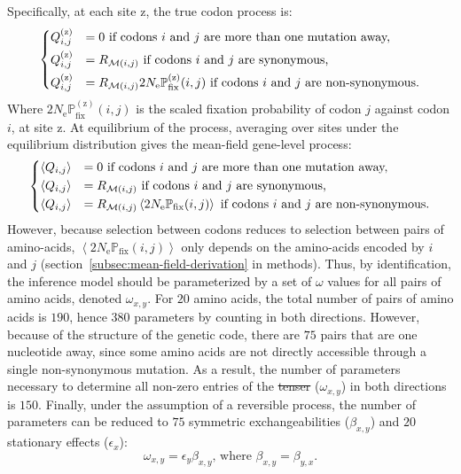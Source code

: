 \documentclass{article}
\newcommand{\Ne}{N_{\text{e}}} %
\newcommand{\proba}{\mathbb{P}} %
\newcommand{\Pfix}{2 \Ne \proba_{\text{fix}}} %
\newcommand{\mutmatrix}{R} %
\newcommand{\ci}{{i}} %
\newcommand{\cj}{{j}} %
\newcommand{\itoj}{\ci, \cj} %
\newcommand{\nuc}{\mathcal{M}} %
\newcommand{\nucitoj}{\nuc(\itoj)} %
\newcommand{\submatrix}{Q} %
\newcommand{\aaSource}{x} %
\newcommand{\aaTarget}{y} %
\newcommand{\AAexchan}{\beta} %
\newcommand{\AAequi}{\epsilon} %
\newcommand{\site}{\text{z}} %
\newcommand{\siteexp}{^{(\site)}} %
\providecommand{\DIFaddtex}[1]{{\protect\color{blue}\uwave{#1}}} %
\providecommand{\DIFdeltex}[1]{{\protect\color{red}\sout{#1}}}                      %
\providecommand{\DIFaddbegin}{} %
\providecommand{\DIFaddend}{} %
\providecommand{\DIFdelbegin}{} %
\providecommand{\DIFdelend}{} %
\providecommand{\DIFadd}[1]{\texorpdfstring{\DIFaddtex{#1}}{#1}} %
\providecommand{\DIFdel}[1]{\texorpdfstring{\DIFdeltex{#1}}{}} %
\begin{document}
Specifically, at each site $\site$, the true codon process is:
\begin{equation}
 \begin{dcases}
 \submatrix_{\itoj}\siteexp & = 0 \text{ if codons $\ci$ and $\cj$ are more than one mutation away,} \\
 \submatrix_{\itoj}\siteexp & = \mutmatrix_{\nucitoj} \text{ if codons $\ci$ and $\cj$ are {synonymous},} \\
 \submatrix_{\itoj}\siteexp & = \mutmatrix_{\nucitoj} \Pfix\siteexp(\itoj) \text{ if codons $\ci$ and $\cj$ are non-synonymous}.
 \end{dcases}
 \label{eq:codon-site-processs}
\end{equation}
Where $\Pfix\siteexp(\itoj)$ is the scaled fixation probability of codon $\cj$ against codon $\ci$, at site $\site$.
At equilibrium of the process, averaging over sites under the equilibrium distribution gives the mean-field gene-level process:
\begin{equation}
 \begin{dcases}
 \left\langle \submatrix_{\itoj} \right\rangle & = 0 \text{ if codons $\ci$ and $\cj$ are more than one mutation away,} \\
 \left\langle \submatrix_{\itoj} \right\rangle & = \mutmatrix_{\nucitoj} \text{ if codons $\ci$ and $\cj$ are {synonymous},} \\
 \left\langle \submatrix_{\itoj} \right\rangle & = \mutmatrix_{\nucitoj} \left\langle \Pfix (\itoj) \right\rangle \text{ if codons $\ci$ and $\cj$ are non-synonymous}.
 \end{dcases}
 \label{eq:codon-avg-process}
\end{equation}
However, because selection between codons reduces to selection between pairs of amino-acids, $\left\langle \Pfix (\itoj) \right\rangle$ only depends on the amino-acids encoded by $\ci$ and $\cj$ (section~\ref{subsec:mean-field-derivation} in methods).
Thus, by identification, the inference model should be parameterized by a set of $\omega$ values for all pairs of amino acids, denoted $\omega_{\aaSource, \aaTarget}$.
For $20$ amino acids, the total number of pairs of amino acids is $190$, hence $380$ parameters by counting in both directions.
However, because of the structure of the genetic code, there are $75$ pairs that are one nucleotide away, since some amino acids are not directly accessible through a single {non-synonymous} mutation.
As a result, the number of parameters necessary to determine all non-zero entries of the \DIFdelbegin \DIFdel{tenser }\DIFdelend \DIFaddbegin \DIFadd{tensor }\DIFaddend ($\omega_{\aaSource, \aaTarget}$) in both directions is $150$.
Finally, under the assumption of a reversible process, the number of parameters can be reduced to $75$ symmetric exchangeabilities ($\AAexchan_{\aaSource, \aaTarget}$) and $20$ stationary effects ($\AAequi_{\aaSource}$):
\begin{equation}
 \omega_{\aaSource, \aaTarget} = \AAequi_{\aaTarget} \AAexchan_{\aaSource, \aaTarget}\text{, where } \AAexchan_{\aaSource, \aaTarget} = \AAexchan_{\aaTarget, \aaSource}.\label{eq:omega-reversible}
\end{equation}
\end{document}
